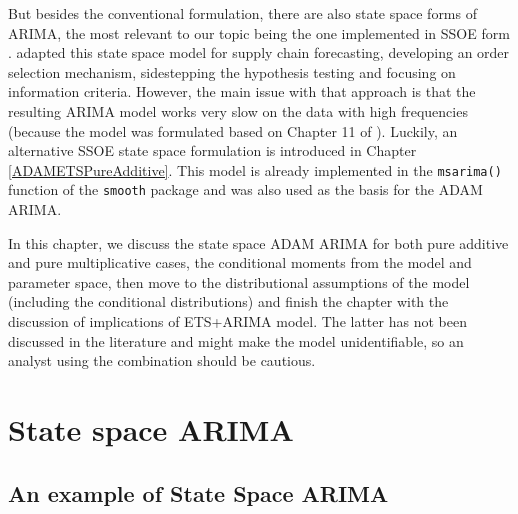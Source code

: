 \documentclass[]{book}
\theoremstyle{definition}
\theoremstyle{definition}
\theoremstyle{definition}
\theoremstyle{definition}
\theoremstyle{remark}
\begin{document}
But besides the conventional formulation, there are also state space forms of ARIMA, the most relevant to our topic being the one implemented in SSOE form \citep[Chapter 11 of][]{Hyndman2008b}. \citet{Svetunkov2019} adapted this state space model for supply chain forecasting, developing an order selection mechanism, sidestepping the hypothesis testing and focusing on information criteria. However, the main issue with that approach is that the resulting ARIMA model works very slow on the data with high frequencies (because the model was formulated based on Chapter 11 of \citet{Hyndman2008b}). Luckily, an alternative SSOE state space formulation is introduced in Chapter \ref{ADAMETSPureAdditive}. This model is already implemented in the \texttt{msarima()} function of the \texttt{smooth} package and was also used as the basis for the ADAM ARIMA.

In this chapter, we discuss the state space ADAM ARIMA for both pure additive and pure multiplicative cases, the conditional moments from the model and parameter space, then move to the distributional assumptions of the model (including the conditional distributions) and finish the chapter with the discussion of implications of ETS+ARIMA model. The latter has not been discussed in the literature and might make the model unidentifiable, so an analyst using the combination should be cautious.

\hypertarget{StateSpaceARIMA}{%
\section{State space ARIMA}\label{StateSpaceARIMA}}

\hypertarget{an-example-of-state-space-arima}{%
\subsection{An example of State Space ARIMA}\label{an-example-of-state-space-arima}}
\end{document}
